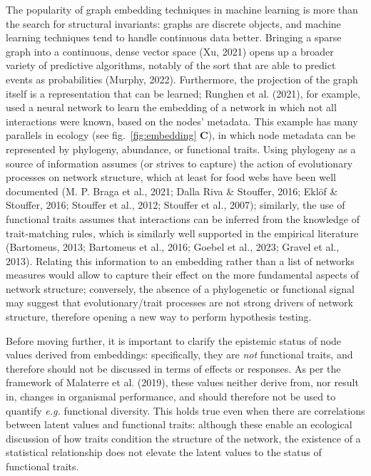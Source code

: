 \documentclass[10pt,oneside]{article}
\begin{document}
The popularity of graph embedding techniques in machine learning is more
than the search for structural invariants: graphs are discrete objects,
and machine learning techniques tend to handle continuous data better.
Bringing a sparse graph into a continuous, dense vector space (Xu, 2021)
opens up a broader variety of predictive algorithms, notably of the sort
that are able to predict events as probabilities (Murphy, 2022).
Furthermore, the projection of the graph itself is a representation that
can be learned; Runghen et al. (2021), for example, used a neural
network to learn the embedding of a network in which not all
interactions were known, based on the nodes' metadata. This example has
many parallels in ecology (see fig.~\ref{fig:embedding} \textbf{C}), in
which node metadata can be represented by phylogeny, abundance, or
functional traits. Using phylogeny as a source of information assumes
(or strives to capture) the action of evolutionary processes on network
structure, which at least for food webs have been well documented (M. P.
Braga et al., 2021; Dalla Riva \& Stouffer, 2016; Eklöf \& Stouffer,
2016; Stouffer et al., 2012; Stouffer et al., 2007); similarly, the use
of functional traits assumes that interactions can be inferred from the
knowledge of trait-matching rules, which is similarly well supported in
the empirical literature (Bartomeus, 2013; Bartomeus et al., 2016;
Goebel et al., 2023; Gravel et al., 2013). Relating this information to
an embedding rather than a list of networks measures would allow to
capture their effect on the more fundamental aspects of network
structure; conversely, the absence of a phylogenetic or functional
signal may suggest that evolutionary/trait processes are not strong
drivers of network structure, therefore opening a new way to perform
hypothesis testing.

Before moving further, it is important to clarify the epistemic status
of node values derived from embeddings: specifically, they are
\emph{not} functional traits, and therefore should not be discussed in
terms of effects or responses. As per the framework of Malaterre et al.
(2019), these values neither derive from, nor result in, changes in
organismal performance, and should therefore not be used to quantify
\emph{e.g.} functional diversity. This holds true even when there are
correlations between latent values and functional traits: although these
enable an ecological discussion of how traits condition the structure of
the network, the existence of a statistical relationship does not
elevate the latent values to the status of functional traits.
\end{document}
